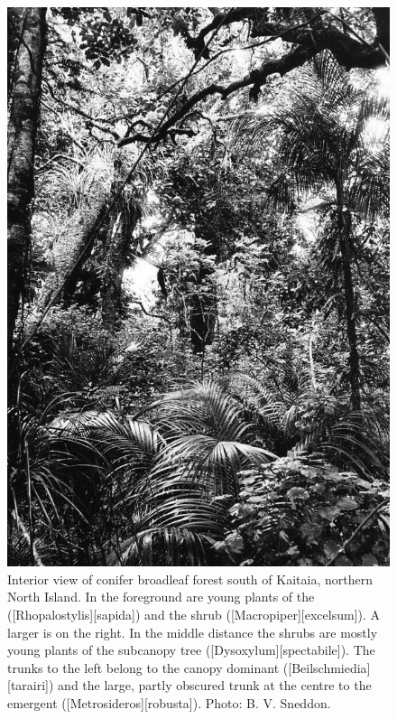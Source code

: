 {\begin{figure}[!t]
\begin{minipage}[t]{\textwidth}
\begin{minipage}[t]{(\textwidth-\fgap) * \real{0.457}}
				\includegraphics[width=\textwidth]{graphics/fig_008}
				\caption[Interior view of conifer broadleaf forest south of Kaitaia]{Interior view of conifer broadleaf forest south of Kaitaia, northern North Island.
				In the foreground are young plants of the  ([Rhopalostylis][sapida]) and the shrub  ([excelsum]).
				A larger  is on the right.
				In the middle distance the shrubs are mostly young plants of the subcanopy tree  ([Dysoxylum][spectabile]).
				The trunks to the left belong to the canopy dominant  ([Beilschmiedia][tarairi]) and the large, partly obscured trunk at the centre to the emergent  ([Metrosideros][robusta]).
				Photo: B. V. Sneddon.}%
				\label{fig:8conifer}
			\end{minipage}
		\end{minipage}
	\end{figure}
}

